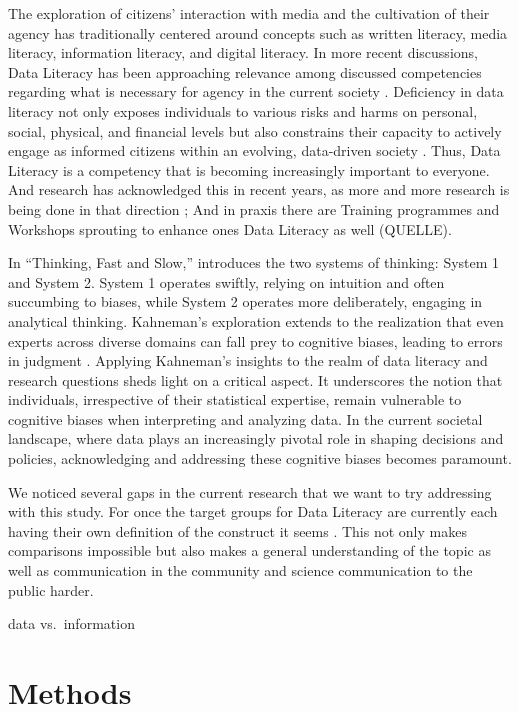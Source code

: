 \documentclass[
  12pt,
  a4paper,
  twoside]{article}
\begin{document}
The exploration of citizens' interaction with media and the cultivation of their agency has traditionally centered around concepts such as written literacy, media literacy, information literacy, and digital literacy. In more recent discussions, Data Literacy has been approaching relevance among discussed competencies regarding what is necessary for agency in the current society \parencite{carmi2020}. Deficiency in data literacy not only exposes individuals to various risks and harms on personal, social, physical, and financial levels but also constrains their capacity to actively engage as informed citizens within an evolving, data-driven society \parencite{carmi2020}. Thus, Data Literacy is a competency that is becoming increasingly important to everyone. And research has acknowledged this in recent years, as more and more research is being done in that direction \parencite{Cui2023}; And in praxis there are Training programmes and Workshops sprouting to enhance ones Data Literacy as well (QUELLE).

In ``Thinking, Fast and Slow,'' \cite{kahneman2011} introduces the two systems of thinking: System 1 and System 2. System 1 operates swiftly, relying on intuition and often succumbing to biases, while System 2 operates more deliberately, engaging in analytical thinking. Kahneman's exploration extends to the realization that even experts across diverse domains can fall prey to cognitive biases, leading to errors in judgment \parencite{kahneman2011}.
Applying Kahneman's insights to the realm of data literacy and research questions sheds light on a critical aspect. It underscores the notion that individuals, irrespective of their statistical expertise, remain vulnerable to cognitive biases when interpreting and analyzing data. In the current societal landscape, where data plays an increasingly pivotal role in shaping decisions and policies, acknowledging and addressing these cognitive biases becomes paramount.

We noticed several gaps in the current research that we want to try addressing with this study. For once the target groups for Data Literacy are currently each having their own definition of the construct it seems \parencite{Cui2023}. This not only makes comparisons impossible but also makes a general understanding of the topic as well as communication in the community and science communication to the public harder.

data vs.~information

\hypertarget{methods}{%
\section*{Methods}\label{methods}}
\end{document}
